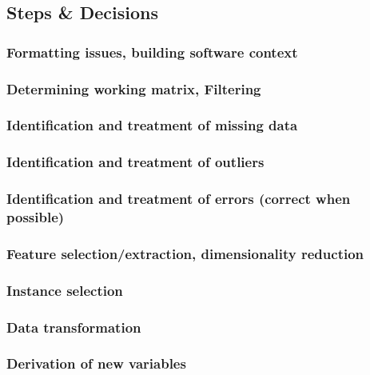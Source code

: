 
\subsection{Steps & Decisions}%
\label{sub:steps-decisions}

\subsubsection{Formatting issues, building software context}
\subsubsection{Determining working matrix, Filtering}
\subsubsection{Identification and treatment of missing data}
\subsubsection{Identification and treatment of outliers}
\subsubsection{Identification and treatment of errors (correct when possible)}
\subsubsection{Feature selection/extraction, dimensionality reduction}
\subsubsection{Instance selection}
\subsubsection{Data transformation}
\subsubsection{Derivation of new variables}



